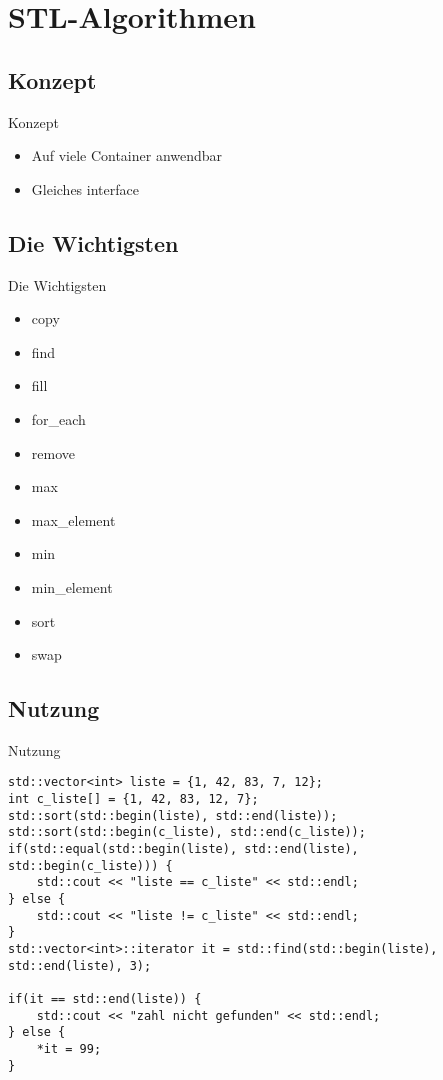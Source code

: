 \section{STL-Algorithmen}


\subsection{Konzept}

\begin{frame}{Konzept}
	\begin{itemize}
		\item Auf viele Container anwendbar
		\item Gleiches interface
	\end{itemize}
\end{frame}

\subsection{Die Wichtigsten}

\begin{frame}{Die Wichtigsten}
	\begin{itemize}
		\item copy
		\item find
		\item fill
		\item for\_each
		\item remove
		\item max
		\item max\_element
		\item min
		\item min\_element
		\item sort
		\item swap
	\end{itemize}
\end{frame}

\subsection{Nutzung}

\begin{frame}[fragile]{Nutzung}
	
	\begin{lstlisting}[escapechar=\$]
std::vector<int> liste = {1, 42, 83, 7, 12};
int c_liste[] = {1, 42, 83, 12, 7};
std::sort(std::begin(liste), std::end(liste));
std::sort(std::begin(c_liste), std::end(c_liste));
if(std::equal(std::begin(liste), std::end(liste), std::begin(c_liste))) {
	std::cout << "liste == c_liste" << std::endl;
} else {
	std::cout << "liste != c_liste" << std::endl;
}
std::vector<int>::iterator it = std::find(std::begin(liste), std::end(liste), 3);

if(it == std::end(liste)) {
	std::cout << "zahl nicht gefunden" << std::endl;
} else {
	*it = 99;
}
	\end{lstlisting}
	
\end{frame}
